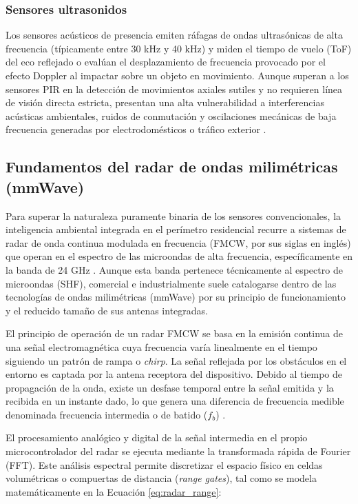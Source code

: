 \subsubsection{Sensores ultrasonidos}
Los sensores acústicos de presencia emiten ráfagas de ondas ultrasónicas de alta frecuencia (típicamente entre 30 kHz y 40 kHz) y miden el tiempo de vuelo (ToF) del eco reflejado o evalúan el desplazamiento de frecuencia provocado por el efecto Doppler al impactar sobre un objeto en movimiento. Aunque superan a los sensores PIR en la detección de movimientos axiales sutiles y no requieren línea de visión directa estricta, presentan una alta vulnerabilidad a interferencias acústicas ambientales, ruidos de conmutación y oscilaciones mecánicas de baja frecuencia generadas por electrodomésticos o tráfico exterior \cite{labeodan2015survey}.

\subsection{Fundamentos del radar de ondas milimétricas (mmWave)}
Para superar la naturaleza puramente binaria de los sensores convencionales, la inteligencia ambiental integrada en el perímetro residencial recurre a sistemas de radar de onda continua modulada en frecuencia (FMCW, por sus siglas en inglés) que operan en el espectro de las microondas de alta frecuencia, específicamente en la banda de 24 GHz \cite{soumya2023mmwave}. Aunque esta banda pertenece técnicamente al espectro de microondas (SHF), comercial e industrialmente suele catalogarse dentro de las tecnologías de ondas milimétricas (mmWave) por su principio de funcionamiento y el reducido tamaño de sus antenas integradas.

El principio de operación de un radar FMCW se basa en la emisión continua de una señal electromagnética cuya frecuencia varía linealmente en el tiempo siguiendo un patrón de rampa o \textit{chirp}. La señal reflejada por los obstáculos en el entorno es captada por la antena receptora del dispositivo. Debido al tiempo de propagación de la onda, existe un desfase temporal entre la señal emitida y la recibida en un instante dado, lo que genera una diferencia de frecuencia medible denominada frecuencia intermedia o de batido ($f_b$) \cite{rao2017introduction}.

El procesamiento analógico y digital de la señal intermedia en el propio microcontrolador del radar se ejecuta mediante la transformada rápida de Fourier (FFT). Este análisis espectral permite discretizar el espacio físico en celdas volumétricas o compuertas de distancia (\textit{range gates}), tal como se modela matemáticamente en la Ecuación \ref{eq:radar_range}:


